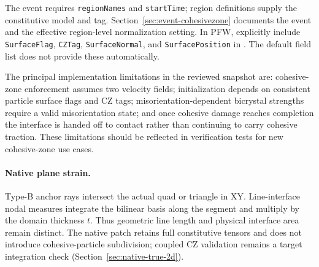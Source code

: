 The event requires \texttt{regionNames} and \texttt{startTime}; region definitions supply the constitutive model and tag. Section~\ref{sec:event-cohesivezone} documents the event and the effective region-level normalization setting. In PFW, explicitly include \texttt{SurfaceFlag}, \texttt{CZTag}, \texttt{SurfaceNormal}, and \texttt{SurfacePosition} in . The default field list does not provide these automatically.

The principal implementation limitations in the reviewed snapshot are: cohesive-zone enforcement assumes two velocity fields; initialization depends on consistent particle surface flags and CZ tags; misorientation-dependent bicrystal strengths require a valid misorientation state; and once cohesive damage reaches completion the interface is handed off to contact rather than continuing to carry cohesive traction.  These limitations should be reflected in verification tests for new cohesive-zone use cases.

\paragraph{Native plane strain.}
Type-B anchor rays intersect the actual quad or triangle in XY. Line-interface
nodal measures integrate the bilinear basis along the segment and multiply by
the domain thickness $t$. Thus geometric line length and physical interface
area remain distinct. The native patch retains full constitutive tensors and
does not introduce cohesive-particle subdivision; coupled CZ validation remains
a target integration check (Section~\ref{sec:native-true-2d}).
